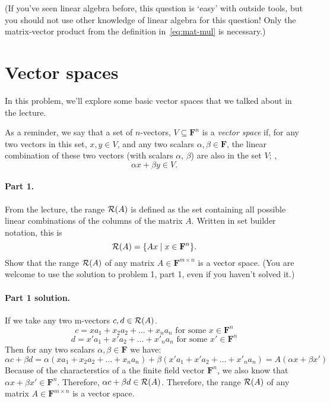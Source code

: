 \documentclass[12pt]{article}
\newcommand{\field}{\mathbf{F}}
\begin{document}
(If you've seen linear algebra before, this question is `easy' with outside
tools, but you should not use other knowledge of linear algebra for this
question! Only the matrix-vector product from the definition
in~\eqref{eq:mat-mul} is necessary.)

\section{Vector spaces}
In this problem, we'll explore some basic vector spaces that we talked about in the
lecture.

As a reminder, we say that a set of $n$-vectors, $V \subseteq \field^n$ is a
\emph{vector space} if, for any two vectors in this set, $x, y \in V$, and any
two scalars $\alpha, \beta \in \field$, the linear combination of these two
vectors (with scalars $\alpha$, $\beta$) are also in the set $V$; \ie,
\[
    \alpha x + \beta y \in V.
\]

\paragraph{Part 1.} From the lecture, the range ${\mathcal R}(A)$
is defined as the set containing all possible linear combinations of the
columns of the matrix $A$. Written in set builder notation, this is
\[
    \range(A) = \{Ax \mid x \in \field^n\}.
\]
Show that the range ${\mathcal R}(A)$ of any matrix $A \in \field^{m\times n}$ is a
vector space. (You are welcome to use the solution to problem 1, part 1, even
if you haven't solved it.)

\begin{solution}
\paragraph{Part 1 solution.}
    If we take any two m-vectors $c, d \in {\mathcal R}(A)$. 
    \[
        c = x a_1 + x_2 a_2 + \dots + x_n a_n \text{ for some $x \in \field^n$}
    \]
    \[
        d = x' a_1 + x' a_2 + \dots + x'_n a_n \text{ for some $x' \in \field^n$}
    \]
    Then for any two scalars $\alpha, \beta \in \field$ we have:
    \[
        \alpha c + \beta d = \alpha (x a_1 + x_2 a_2 + \dots + x_n a_n) + \beta (x' a_1 + x' a_2 + \dots + x'_n a_n) = A(\alpha x + \beta x')
    \]
    Because of the characterstics of a the finite field vector $\field^n$, we also know that $\alpha x + \beta x' \in \field^n$. Therefore, $\alpha c + \beta d \in {\mathcal R}(A)$. Therefore, the range ${\mathcal R}(A)$ of any matrix $A \in \field^{m\times n}$ is a vector space.
\end{solution}
\end{document}
